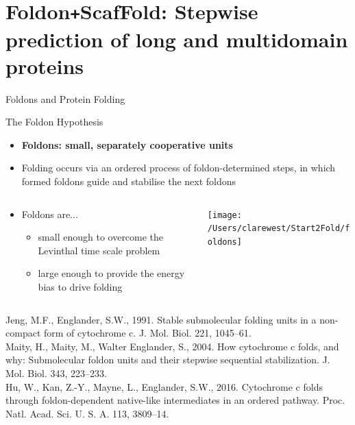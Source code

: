 \documentclass{beamer}
\def\Plus{\texttt{+}}
\begin{document}
\section{Foldon\Plus ScafFold: Stepwise prediction of long and multidomain proteins}
\begin{frame}{Foldons and Protein Folding}
  \begin{center}
    \begin{block}{The Foldon Hypothesis}
      \begin{itemize}
        \item \textbf{Foldons: small, separately cooperative units}
        \item Folding occurs via an ordered process of foldon-determined steps, in which formed foldons guide and stabilise the next foldons  
      \end{itemize}
      \begin{columns}
        \begin{column}{0.5\textwidth}
          \begin{itemize}
            \item Foldons are...
              \begin{itemize}
                \item small enough to overcome the Levinthal time scale problem
                \item large enough to provide the energy bias to drive folding 
              \end{itemize}
          \end{itemize}
        \end{column}
        \begin{column}{0.5\textwidth}
          \begin{center}
            \texttt{[image: /Users/clarewest/Start2Fold/foldons]}\\
          \end{center}
        \end{column}
      \end{columns}
      \vspace{3mm}
    \end{block}
    \vspace{0.5mm}
  \end{center}
    \tiny{Jeng, M.F., Englander, S.W., 1991. Stable submolecular folding units in a non-compact form of cytochrome c. J. Mol. Biol. 221, 1045–61.} \\
    \tiny{Maity, H., Maity, M., Walter Englander, S., 2004. How cytochrome c folds, and why: Submolecular foldon units and their stepwise sequential stabilization. J. Mol. Biol. 343, 223–233.} \\
    \tiny{Hu, W., Kan, Z.-Y., Mayne, L., Englander, S.W., 2016. Cytochrome c folds through foldon-dependent native-like intermediates in an ordered pathway. Proc. Natl. Acad. Sci. U. S. A. 113, 3809–14.} \\
\end{frame}
\end{document}
